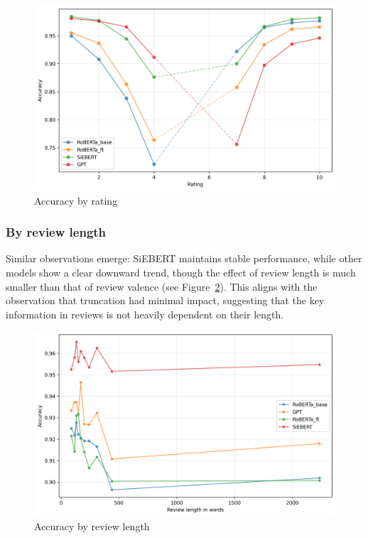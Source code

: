 \documentclass{article}
\begin{document}
\begin{figure}
  \centering
  \includegraphics[width=\textwidth]{accuracy_vs_ratings.png}
  \caption{Accuracy by rating}
  \label{fig:accuracy-ratings}
\end{figure}

\subsubsection{By review length}

Similar observations emerge: SiEBERT maintains stable performance, while other models show a clear downward trend, though the effect of review length is much smaller than that of review valence (see Figure~\ref{fig:accuracy-length}). This aligns with the observation that truncation had minimal impact, suggesting that the key information in reviews is not heavily dependent on their length.

\begin{figure}
  \centering
  \includegraphics[width=\textwidth]{accuracy_vs_wordcount.png}
  \caption{Accuracy by review length}
  \label{fig:accuracy-length}
\end{figure}
\end{document}
